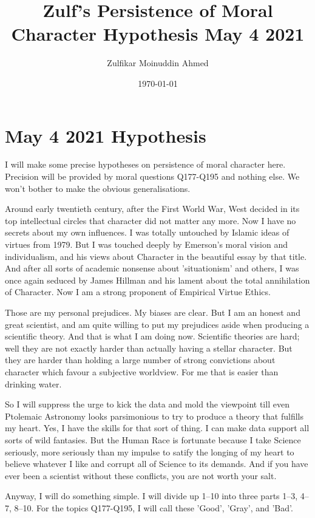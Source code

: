 \documentclass{amsart}
\title{Zulf's Persistence of Moral Character Hypothesis May 4 2021}
\author{Zulfikar Moinuddin Ahmed}
\date{\today}
\begin{document}
\maketitle

\section{May 4 2021  Hypothesis}

I will make some precise hypotheses on persistence of moral character here.  Precision will be provided by moral questions Q177-Q195 and nothing else.  We won't bother to make the obvious generalisations.  

Around early twentieth century, after the First World War, West decided in its top intellectual circles that character did not matter any more.  Now I have no secrets about my own influences.  I was totally untouched by Islamic ideas of virtues from 1979.  But I was touched deeply by Emerson's moral vision and individualism, and his views about Character in the beautiful essay by that title.  And after all sorts of academic nonsense about 'situationism' and others, I was once again seduced by James Hillman and his lament about the total annihilation of Character.  Now I am a strong proponent of Empirical Virtue Ethics.  

Those are my personal prejudices.  My biases are clear.  But I am an honest and great scientist, and am quite willing to put my prejudices aside when producing a scientific theory.  And that is what I am doing now.  Scientific theories are hard; well they are not exactly harder than actually having a stellar character.  But they are harder than holding a large number of strong convictions about character which favour a subjective worldview. For me that is easier than drinking water.

So I will suppress the urge to kick the data and mold the viewpoint till even Ptolemaic Astronomy looks parsimonious to try to produce a theory that fulfills my heart.  Yes, I have the skills for that sort of thing.  I can make data support all sorts of wild fantasies.  But the Human Race is fortunate because I take Science seriously, more seriously than my impulse to satify the longing of my heart to believe whatever I like and corrupt all of Science to its demands.  And if you have ever been a scientist without these conflicts, you are not worth your salt.  

Anyway,  I will do something simple.  I will divide up 1--10 into three parts 1--3, 4--7, 8--10.  For the topics Q177-Q195, I will call these 'Good', 'Gray', and 'Bad'.  
\end{document}
